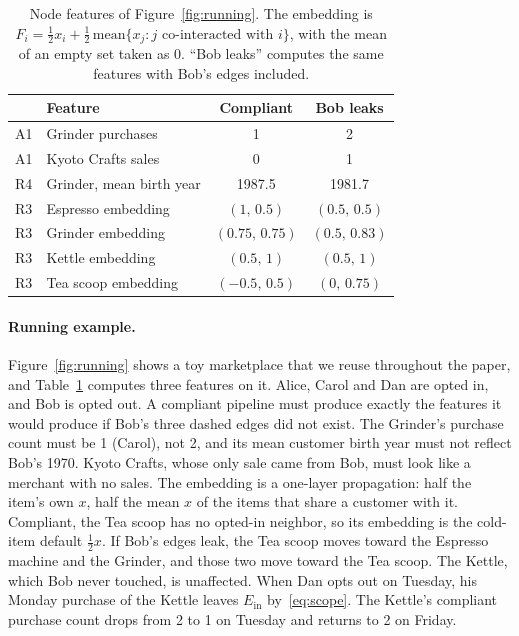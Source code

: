 \documentclass[10pt,twocolumn,letterpaper]{article}
\theoremstyle{definition}
\newcommand{\Ein}{E_{\mathrm{in}}}
\begin{document}
\begin{table}[t]
\centering\footnotesize
\setlength{\tabcolsep}{3pt}
\begin{tabular}{@{}llcc@{}}
\toprule
& Feature & Compliant & Bob leaks \\
\midrule
A1 & Grinder purchases & 1 & 2 \\
A1 & Kyoto Crafts sales & 0 & 1 \\
R4 & Grinder, mean birth year & 1987.5 & 1981.7 \\
\midrule
R3 & Espresso embedding & $(1,\,0.5)$ & $(0.5,\,0.5)$ \\
R3 & Grinder embedding & $(0.75,\,0.75)$ & $(0.5,\,0.83)$ \\
R3 & Kettle embedding & $(0.5,\,1)$ & $(0.5,\,1)$ \\
R3 & Tea scoop embedding & $({-}0.5,\,0.5)$ & $(0,\,0.75)$ \\
\bottomrule
\end{tabular}
\caption{Node features of Figure~\ref{fig:running}. The embedding is $F_i=\tfrac12 x_i+\tfrac12\,\mathrm{mean}\{x_j: j\text{ co-interacted with } i\}$, with the mean of an empty set taken as $0$. ``Bob leaks'' computes the same features with Bob's edges included.}
\label{tab:running}
\end{table}

\paragraph{Running example.}
Figure~\ref{fig:running} shows a toy marketplace that we reuse throughout the
paper, and Table~\ref{tab:running} computes three features on it. Alice, Carol
and Dan are opted in, and Bob is opted out. A compliant pipeline must produce
exactly the features it would produce if Bob's three dashed edges did not
exist. The Grinder's purchase count must be 1 (Carol), not 2, and its mean
customer birth year must not reflect Bob's 1970. Kyoto Crafts, whose only sale
came from Bob, must look like a merchant with no sales. The embedding is a
one-layer propagation: half the item's own $x$, half the mean $x$ of the items
that share a customer with it. Compliant, the Tea scoop has no opted-in
neighbor, so its embedding is the cold-item default $\tfrac12 x$. If Bob's
edges leak, the Tea scoop moves toward the Espresso machine and the Grinder,
and those two move toward the Tea scoop. The Kettle, which Bob never touched,
is unaffected. When Dan opts out on Tuesday, his Monday purchase of the
Kettle leaves $\Ein$ by~\eqref{eq:scope}. The Kettle's compliant purchase count
drops from 2 to 1 on Tuesday and returns to 2 on Friday.
\end{document}
